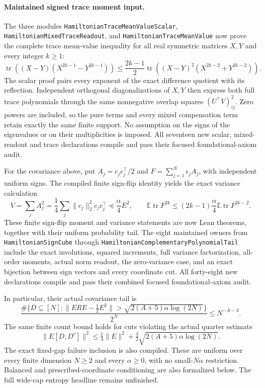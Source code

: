 \paragraph{Maintained signed trace moment input.}
The three modules \texttt{HamiltonianTraceMeanValueScalar},
\texttt{HamiltonianMixedTraceReadout}, and
\texttt{HamiltonianTraceMeanValue} now prove the complete
trace mean-value inequality for all real symmetric matrices
\(X,Y\) and every integer \(k\geq1\):
\[
 \operatorname{tr}\!\left((X-Y)(X^{2k-1}-Y^{2k-1})\right)
 \leq \frac{2k-1}{2}
       \operatorname{tr}\!\left((X-Y)^2(X^{2k-2}+Y^{2k-2})\right).
\]
The scalar proof pairs every exponent of the exact difference
quotient with its reflection. Independent orthogonal
diagonalizations of \(X,Y\) then express both full trace
polynomials through the same nonnegative overlap squares
\((U^\top V)_{ij}^2\). Zero powers are included, so the pure
terms and every mixed compensation term retain exactly the
same finite support. No assumption on the signs of the
eigenvalues or on their multiplicities is imposed.
All seventeen new scalar, mixed-readout and trace declarations
compile and pass their focused foundational-axiom audit.

For the covariance above, put \(A_j=c_jc_j^\top/2\) and
\(F=\sum_{j=1}^N\epsilon_jA_j\), with independent uniform signs.
The compiled finite sign-flip identity yields the exact
variance calculation
\[
 V=\sum_j A_j^2
  =\frac14\sum_j\|c_j\|_2^2c_jc_j^\top
  \preceq \frac{\alpha}{4}E^2,
 \qquad
 \mathbb E\operatorname{tr} F^{2k}
 \leq (2k-1)\frac{\alpha}{4}\mathbb E\operatorname{tr} F^{2k-2}.
\]
These finite sign-flip moment and variance statements are now
Lean theorems, together with their uniform probability tail.
The eight maintained owners from \texttt{HamiltonianSignCube}
through \texttt{HamiltonianComplementaryPolynomialTail}
include the exact involutions, squared increments, full
variance factorization, all-order moments, actual norm
readout, the zero-variance case, and an exact bijection
between sign vectors and every coordinate cut.
All forty-eight new declarations compile and pass their
combined focused foundational-axiom audit.

In particular, their actual covariance tail is
\[
 \frac{\#\{D\subseteq[N]:
   \|ERE-\tfrac12E^2\|>
       \sqrt{2(A+5)\alpha\log(2N)}\}}{2^N}
          \leq N^{-A-3}.
\]
The same finite count bound holds for cuts violating the
actual quarter estimate
\[
 \|E[D,D^c]\|^2
 \leq\tfrac14\|E\|^2+
          \tfrac32\sqrt{2(A+5)\alpha\log(2N)}.
\]
The exact fixed-gap failure inclusion is also compiled.
These are uniform over every finite dimension \(N\geq2\)
and every \(\alpha\geq0\), with no small-\(N\alpha\)
restriction. Balanced and prescribed-coordinate conditioning
are also formalized below. The full wide-cap entropy
headline remains unfinished.

